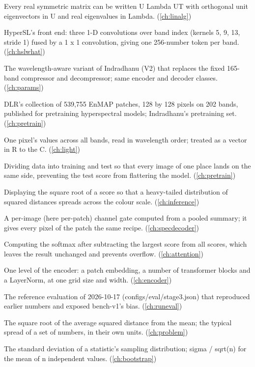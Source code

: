 \begin{description}[style=nextline,leftmargin=1.2em,font=\normalfont\bfseries]
\item[Spectral theorem] Every real symmetric matrix can be written U Lambda UT with orthogonal unit eigenvectors in U and real eigenvalues in Lambda. (\cref{ch:linalg})
\item[Spectral tokenizer] HyperSL's front end: three 1-D convolutions over band index (kernels 5, 9, 13, stride 1) fused by a 1 x 1 convolution, giving one 256-number token per band. (\cref{ch:hslwhat})
\item[Spectral-stem model] The wavelength-aware variant of Indradhanu (V2) that replaces the fixed 165-band compressor and decompressor; same encoder and decoder classes. (\cref{ch:params})
\item[SpectralEarth] DLR's collection of 539,755 EnMAP patches, 128 by 128 pixels on 202 bands, published for pretraining hyperspectral models; Indradhanu's pretraining set. (\cref{ch:pretrain})
\item[Spectrum] One pixel's values across all bands, read in wavelength order; treated as a vector in R to the C. (\cref{ch:light})
\item[Split by site] Dividing data into training and test so that every image of one place lands on the same side, preventing the test score from flattering the model. (\cref{ch:pretrain})
\item[Square-root stretch] Displaying the square root of a score so that a heavy-tailed distribution of squared distances spreads across the colour scale. (\cref{ch:inference})
\item[Squeeze-and-excitation] A per-image (here per-patch) channel gate computed from a pooled summary; it gives every pixel of the patch the same recipe. (\cref{ch:specdecoder})
\item[Stable softmax] Computing the softmax after subtracting the largest score from all scores, which leaves the result unchanged and prevents overflow. (\cref{ch:attention})
\item[Stage] One level of the encoder: a patch embedding, a number of transformer blocks and a LayerNorm, at one grid size and width. (\cref{ch:encoder})
\item[Stage 3] The reference evaluation of 2026-10-17 (configs/eval/stage3.json) that reproduced earlier numbers and exposed bench-v1's bias. (\cref{ch:runeval})
\item[Standard deviation] The square root of the average squared distance from the mean; the typical spread of a set of numbers, in their own units. (\cref{ch:problem})
\item[Standard error] The standard deviation of a statistic's sampling distribution; sigma / sqrt(n) for the mean of n independent values. (\cref{ch:bootstrap})

\end{description}

